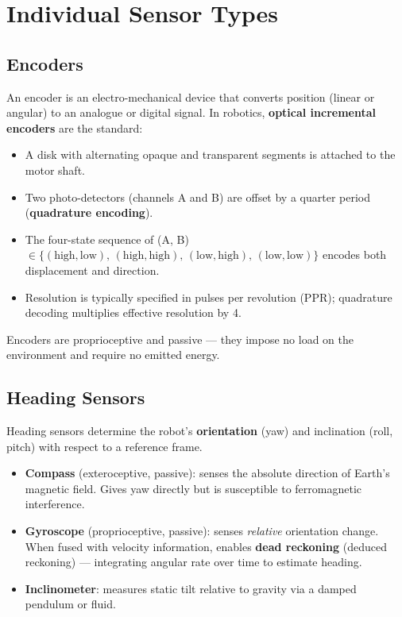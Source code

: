 \documentclass[11pt,a4paper]{article}
\theoremstyle{definition}
\theoremstyle{plain}
\theoremstyle{remark}
\begin{document}
\section{Individual Sensor Types}

\subsection{Encoders}

An encoder is an electro-mechanical device that converts position (linear or angular) to an analogue or digital signal. In robotics, \textbf{optical incremental encoders} are the standard:

\begin{itemize}
    \item A disk with alternating opaque and transparent segments is attached to the motor shaft.
    \item Two photo-detectors (channels A and B) are offset by a quarter period (\textbf{quadrature encoding}).
    \item The four-state sequence of (A, B) $\in \{(\text{high},\text{low}),\, (\text{high},\text{high}),\, (\text{low},\text{high}),\, (\text{low},\text{low})\}$ encodes both displacement and direction.
    \item Resolution is typically specified in pulses per revolution (PPR); quadrature decoding multiplies effective resolution by 4.
\end{itemize}

Encoders are proprioceptive and passive — they impose no load on the environment and require no emitted energy.

\subsection{Heading Sensors}

Heading sensors determine the robot's \textbf{orientation} (yaw) and inclination (roll, pitch) with respect to a reference frame.

\begin{itemize}
    \item \textbf{Compass} (exteroceptive, passive): senses the absolute direction of Earth's magnetic field. Gives yaw directly but is susceptible to ferromagnetic interference.
    \item \textbf{Gyroscope} (proprioceptive, passive): senses \textit{relative} orientation change. When fused with velocity information, enables \textbf{dead reckoning} (deduced reckoning) — integrating angular rate over time to estimate heading.
    \item \textbf{Inclinometer}: measures static tilt relative to gravity via a damped pendulum or fluid.
\end{itemize}
\end{document}
